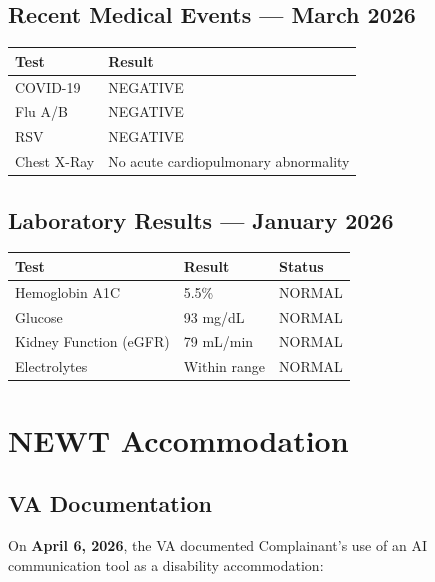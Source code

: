 \documentclass[12pt,letterpaper]{article}
\begin{document}
\subsection{Recent Medical Events --- March 2026}

\begin{center}
\begin{tabular}{ll}
\toprule
\textbf{Test} & \textbf{Result} \\
\midrule
COVID-19 & NEGATIVE \\
Flu A/B & NEGATIVE \\
RSV & NEGATIVE \\
Chest X-Ray & No acute cardiopulmonary abnormality \\
\bottomrule
\end{tabular}
\end{center}

\subsection{Laboratory Results --- January 2026}

\begin{center}
\begin{tabular}{lll}
\toprule
\textbf{Test} & \textbf{Result} & \textbf{Status} \\
\midrule
Hemoglobin A1C & 5.5\% & NORMAL \\
Glucose & 93 mg/dL & NORMAL \\
Kidney Function (eGFR) & 79 mL/min & NORMAL \\
Electrolytes & Within range & NORMAL \\
\bottomrule
\end{tabular}
\end{center}

\newpage

\section{NEWT Accommodation}

\subsection{VA Documentation}

On \textbf{April 6, 2026}, the VA documented Complainant's use of an AI communication tool as a disability accommodation:
\end{document}
